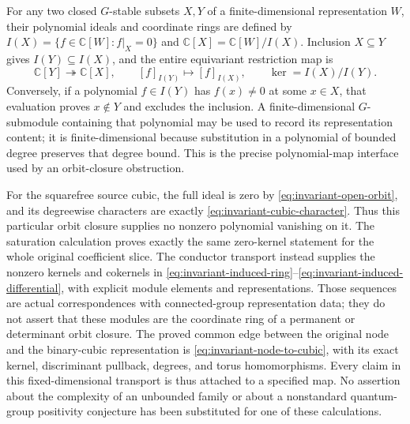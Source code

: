 For any two closed $G$-stable subsets $X,Y$ of a finite-dimensional
representation $W$, their polynomial ideals and coordinate rings
are defined by
$I(X)=\{f\in\mathbb C[W]:f|_X=0\}$ and
$\mathbb C[X]=\mathbb C[W]/I(X)$. Inclusion $X\subseteq Y$ gives
$I(Y)\subseteq I(X)$, and the entire equivariant restriction map is
\[
 \mathbb C[Y]\twoheadrightarrow\mathbb C[X],\qquad
 [f]_{I(Y)}\longmapsto[f]_{I(X)},\qquad
 \ker=I(X)/I(Y).
\]
Conversely, if a polynomial $f\in I(Y)$ has $f(x)\ne0$ at some
$x\in X$, that evaluation proves $x\notin Y$ and excludes the
inclusion. A finite-dimensional $G$-submodule containing that
polynomial may be used to record its representation content; it
is finite-dimensional because substitution in a polynomial of
bounded degree preserves that degree bound. This is the precise
polynomial-map interface used by an orbit-closure obstruction.

For the squarefree source cubic, the full ideal is zero by
\eqref{eq:invariant-open-orbit}, and its degreewise characters are
exactly \eqref{eq:invariant-cubic-character}. Thus this particular
orbit closure supplies no nonzero polynomial vanishing on it.
The saturation calculation proves exactly the same zero-kernel
statement for the whole original coefficient slice. The conductor
transport instead supplies the nonzero kernels and cokernels in
\eqref{eq:invariant-induced-ring}--\eqref{eq:invariant-induced-differential},
with explicit module elements and representations. Those sequences
are actual correspondences with connected-group representation
data; they do not assert that these modules are the coordinate ring
of a permanent or determinant orbit closure. The proved common
edge between the original node and the binary-cubic representation
is \eqref{eq:invariant-node-to-cubic}, with its exact kernel,
discriminant pullback, degrees, and torus homomorphisms. Every claim
in this fixed-dimensional transport is thus attached to a specified
map. No assertion about the complexity of an unbounded family or
about a nonstandard quantum-group positivity conjecture has been
substituted for one of these calculations.
